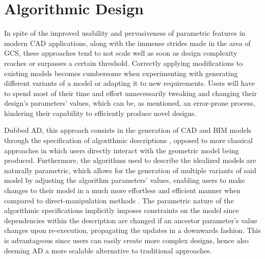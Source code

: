\section{Algorithmic Design}
\label{sec:intro.ad}

In spite of the improved usability and pervasiveness of parametric features in
modern \ac{CAD} applications, along with the immense strides made in the area of
\ac{GCS}, these approaches tend to not scale well as soon as design complexity
reaches or surpasses a certain threshold.  Correctly applying modifications to
existing models becomes cumbersome when experimenting with generating different
variants of a model or adapting it to new requirements.  Users will have to
spend most of their time and effort unnecessarily tweaking and changing their
design's parameters' values, which can be, as mentioned, an error-prone process,
hindering their capability to efficiently produce novel designs.
{\color{cyan}

}

Dubbed \ac{AD}, this approach consists in the generation of \ac{CAD} and
\ac{BIM} models through the specification of algorithmic descriptions
\cite{McCormack:2004:GDPDR}, opposed to more classical approaches in which users
directly interact with the geometric model being produced.  Furthermore, the
algorithms used to describe the idealized models are naturally parametric, which
allows for the generation of multiple variants of said model by adjusting the
algorithm parameters' values, enabling users to make changes to their model in a
much more effortless and efficient manner when compared to direct-manipulation
methods \cite{Leitao:2014:PESLGD}.  The parametric nature of the algorithmic
specifications implicitly imposes constraints on the model since dependencies
within the description are changed if an ancestor parameter's value changes upon
re-execution, propagating the updates in a downwards fashion.  This is
advantageous since users can easily create more complex designs, hence also
deeming \ac{AD} a more scalable alternative to traditional approaches.


